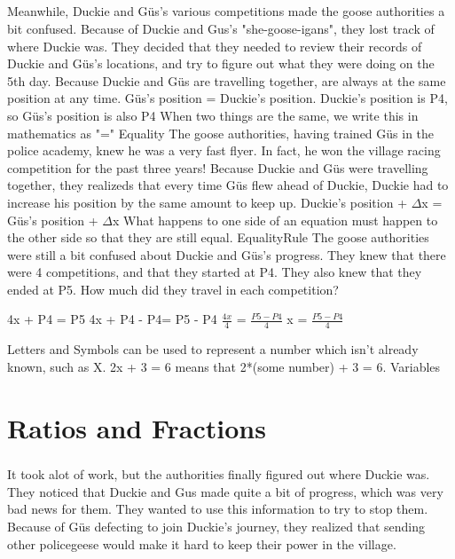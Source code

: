 \documentclass[a4paper,11pt ]{book}
\begin{document}
\paragraph{} Meanwhile, Duckie and Güs's various competitions made the goose authorities a bit confused. Because of Duckie and Gus's "she-goose-igans", they lost track of where Duckie was. They decided that they needed to review their records of Duckie and Güs's locations, and try to figure out what they were doing on the 5th day. 
\vfill
\pagebreak
{Because Duckie and Güs are travelling together, are always at the same position at any time.}
{Güs's position = Duckie's position. Duckie's position is P4, so Güs's position is also P4}
{When two things are the same, we write this in mathematics as "="}
{Equality}
{The goose authorities, having trained Güs in the police academy, knew he was a very fast flyer. In fact, he won the village racing competition for the past three years! Because Duckie and Güs were travelling together, they realizeds that every time Güs flew ahead of Duckie, Duckie had to increase his position by the same amount to keep up.}
{Duckie's position + $\Delta$x = Güs's position + $\Delta$x}
{What happens to one side of an equation must happen to the other side so that they are still equal.}
{EqualityRule}
{The goose authorities were still a bit confused about Duckie and Güs's progress. They knew that there were 4 competitions, and that they started at P4. They also knew that they ended at P5. How much did they travel in each competition?}
{\begin{center} 4x + P4 = P5 \linebreak 4x + P4 - P4= P5 - P4 \linebreak $\frac{4x}{4}$ = $\frac{P5-P4}{4}$ \linebreak x = $\frac{P5-P4}{4}$  \end{center}}
{Letters and Symbols can be used to represent a number which isn’t already known, such as X. 2x + 3 = 6 means that 2*(some number) + 3 = 6.}
{Variables}
\chapter{Ratios and Fractions}
\paragraph{} It took alot of work, but the authorities finally figured out where Duckie was. They noticed that Duckie and Gus made quite a bit of progress, which was very bad news for them. They wanted to use this information to try to stop them. Because of Güs defecting to join Duckie's journey, they realized that sending other policegeese would make it hard to keep their power in the village. 
\end{document}
